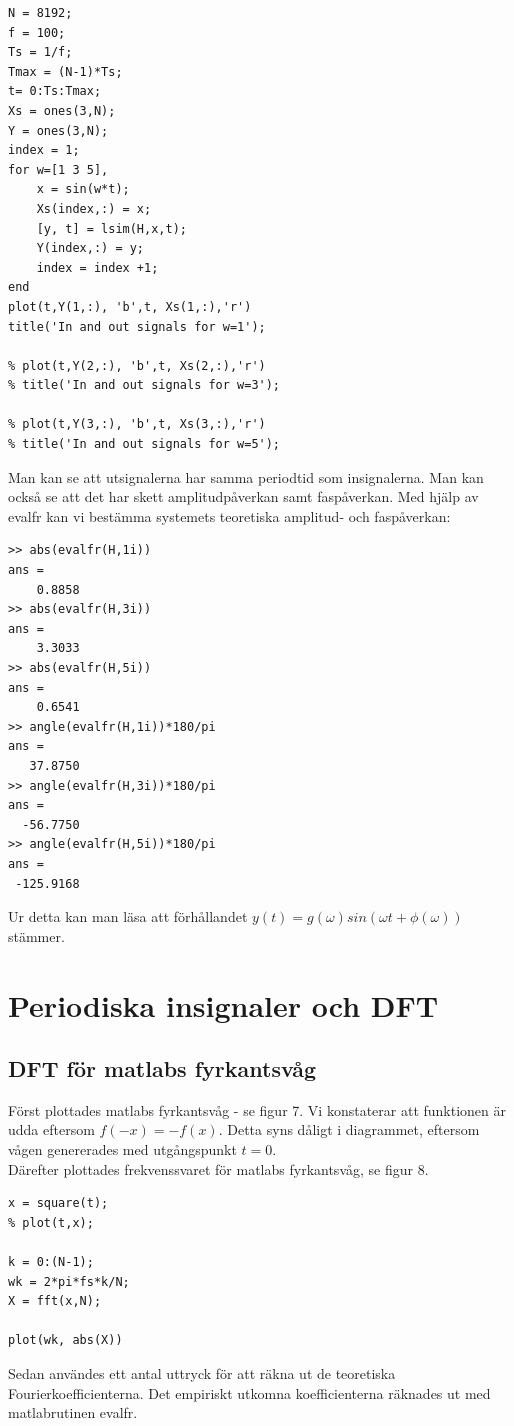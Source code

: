 \documentclass[]{article}
\begin{document}
\begin{verbatim}
N = 8192;
f = 100;
Ts = 1/f;
Tmax = (N-1)*Ts;
t= 0:Ts:Tmax;
Xs = ones(3,N);
Y = ones(3,N);
index = 1;
for w=[1 3 5],
    x = sin(w*t);
    Xs(index,:) = x;
    [y, t] = lsim(H,x,t);
    Y(index,:) = y;
    index = index +1;
end
plot(t,Y(1,:), 'b',t, Xs(1,:),'r')
title('In and out signals for w=1');

% plot(t,Y(2,:), 'b',t, Xs(2,:),'r')
% title('In and out signals for w=3');

% plot(t,Y(3,:), 'b',t, Xs(3,:),'r')
% title('In and out signals for w=5');
\end{verbatim}
Man kan se att utsignalerna har samma periodtid som insignalerna. Man kan också se att det har skett amplitudpåverkan samt faspåverkan.
Med hjälp av evalfr kan vi bestämma systemets teoretiska amplitud- och faspåverkan:
\begin{verbatim}
>> abs(evalfr(H,1i))
ans =
    0.8858
>> abs(evalfr(H,3i))
ans =
    3.3033
>> abs(evalfr(H,5i))
ans =
    0.6541
>> angle(evalfr(H,1i))*180/pi
ans =
   37.8750
>> angle(evalfr(H,3i))*180/pi
ans =
  -56.7750
>> angle(evalfr(H,5i))*180/pi
ans =
 -125.9168
\end{verbatim}

Ur detta kan man läsa att förhållandet $y(t) = g(\omega) sin(\omega t + \phi (\omega))$ stämmer.

\section{Periodiska insignaler och DFT}
\subsection{DFT för matlabs fyrkantsvåg} %
Först plottades matlabs fyrkantsvåg - se figur 7.
Vi konstaterar att funktionen är udda eftersom $f(-x) = -f(x)$. Detta syns dåligt i diagrammet, eftersom vågen genererades med utgångspunkt $t = 0$. \\
Därefter plottades frekvenssvaret för matlabs fyrkantsvåg, se figur 8.
\begin{verbatim}
x = square(t);
% plot(t,x);

k = 0:(N-1);
wk = 2*pi*fs*k/N;
X = fft(x,N);

plot(wk, abs(X))
\end{verbatim}


Sedan användes ett antal uttryck för att räkna ut de teoretiska Fourierkoefficienterna. Det empiriskt utkomna koefficienterna räknades ut med matlabrutinen evalfr. \\
\end{document}

